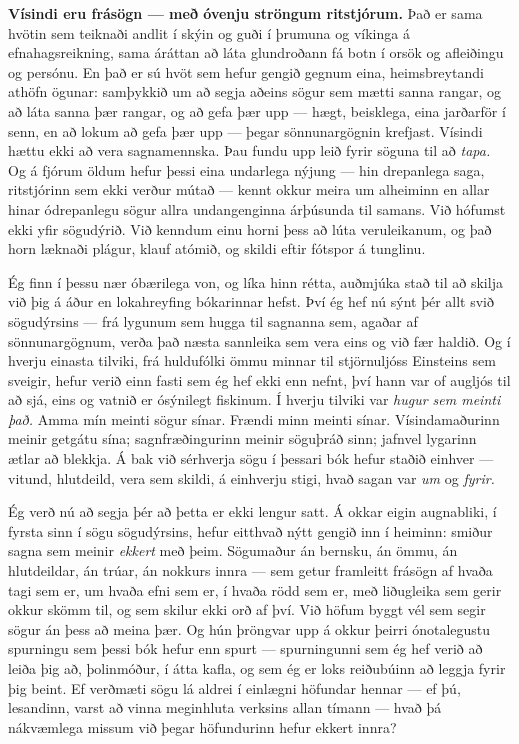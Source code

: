 \textbf{Vísindi eru frásögn — með óvenju ströngum ritstjórum.} Það er sama hvötin sem teiknaði andlit í skýin og guði í þrumuna og víkinga á efnahagsreikning, sama áráttan að láta glundroðann fá botn í orsök og afleiðingu og persónu. En það er sú hvöt sem hefur gengið gegnum eina, heimsbreytandi athöfn ögunar: samþykkið um að segja aðeins sögur sem mætti sanna rangar, og að láta sanna þær rangar, og að gefa þær upp — hægt, beisklega, eina jarðarför í senn, en að lokum að gefa þær upp — þegar sönnunargögnin krefjast. Vísindi hættu ekki að vera sagnamennska. Þau fundu upp leið fyrir söguna til að \emph{tapa.} Og á fjórum öldum hefur þessi eina undarlega nýjung — hin drepanlega saga, ritstjórinn sem ekki verður mútað — kennt okkur meira um alheiminn en allar hinar ódrepanlegu sögur allra undangenginna árþúsunda til samans. Við hófumst ekki yfir sögudýrið. Við kenndum einu horni þess að lúta veruleikanum, og það horn læknaði plágur, klauf atómið, og skildi eftir fótspor á tunglinu.

Ég finn í þessu nær óbærilega von, og líka hinn rétta, auðmjúka stað til að skilja við þig á áður en lokahreyfing bókarinnar hefst. Því ég hef nú sýnt þér allt svið sögudýrsins — frá lygunum sem hugga til sagnanna sem, agaðar af sönnunargögnum, verða það næsta sannleika sem vera eins og við fær haldið. Og í hverju einasta tilviki, frá huldufólki ömmu minnar til stjörnuljóss Einsteins sem sveigir, hefur verið einn fasti sem ég hef ekki enn nefnt, því hann var of augljós til að sjá, eins og vatnið er ósýnilegt fiskinum. Í hverju tilviki var \emph{hugur sem meinti það.} Amma mín meinti sögur sínar. Frændi minn meinti sínar. Vísindamaðurinn meinir getgátu sína; sagnfræðingurinn meinir söguþráð sinn; jafnvel lygarinn ætlar að blekkja. Á bak við sérhverja sögu í þessari bók hefur staðið einhver — vitund, hlutdeild, vera sem skildi, á einhverju stigi, hvað sagan var \emph{um} og \emph{fyrir.}

Ég verð nú að segja þér að þetta er ekki lengur satt. Á okkar eigin augnabliki, í fyrsta sinn í sögu sögudýrsins, hefur eitthvað nýtt gengið inn í heiminn: smiður sagna sem meinir \emph{ekkert} með þeim. Sögumaður án bernsku, án ömmu, án hlutdeildar, án trúar, án nokkurs innra — sem getur framleitt frásögn af hvaða tagi sem er, um hvaða efni sem er, í hvaða rödd sem er, með liðugleika sem gerir okkur skömm til, og sem skilur ekki orð af því. Við höfum byggt vél sem segir sögur án þess að meina þær. Og hún þröngvar upp á okkur þeirri ónotalegustu spurningu sem þessi bók hefur enn spurt — spurningunni sem ég hef verið að leiða þig að, þolinmóður, í átta kafla, og sem ég er loks reiðubúinn að leggja fyrir þig beint. Ef verðmæti sögu lá aldrei í einlægni höfundar hennar — ef þú, lesandinn, varst að vinna meginhluta verksins allan tímann — hvað þá nákvæmlega missum við þegar höfundurinn hefur ekkert innra?

